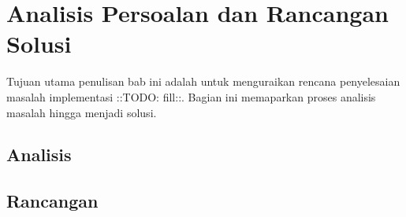\chapter{Analisis Persoalan dan Rancangan Solusi}

Tujuan utama penulisan bab ini adalah untuk menguraikan rencana penyelesaian masalah implementasi ::TODO: fill::. Bagian ini memaparkan proses analisis masalah hingga menjadi solusi.


\section{Analisis}







\section{Rancangan}


